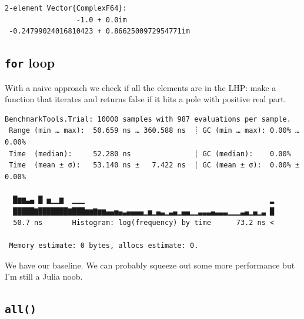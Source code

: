 \documentclass[
  8pt,
  a4paper,
]{book}
\newenvironment{Shaded}{\begin{snugshade}}{\end{snugshade}}
\newcommand{\ConstantTok}[1]{\textcolor[rgb]{0.56,0.35,0.01}{#1}}
\newcommand{\ControlFlowTok}[1]{\textcolor[rgb]{0.00,0.23,0.31}{\textbf{#1}}}
\newcommand{\FloatTok}[1]{\textcolor[rgb]{0.68,0.00,0.00}{#1}}
\newcommand{\FunctionTok}[1]{\textcolor[rgb]{0.28,0.35,0.67}{#1}}
\newcommand{\KeywordTok}[1]{\textcolor[rgb]{0.00,0.23,0.31}{\textbf{#1}}}
\newcommand{\NormalTok}[1]{\textcolor[rgb]{0.00,0.23,0.31}{#1}}
\newcommand{\OperatorTok}[1]{\textcolor[rgb]{0.37,0.37,0.37}{#1}}
\newcommand{\PreprocessorTok}[1]{\textcolor[rgb]{0.68,0.00,0.00}{#1}}
\begin{document}
\begin{verbatim}
2-element Vector{ComplexF64}:
                 -1.0 + 0.0im
 -0.24799024016810423 + 0.8662500972954771im
\end{verbatim}

\subsection{\texorpdfstring{\texttt{for}
loop}{for loop}}\label{for-loop}

With a naive approach we check if all the elements are in the LHP: make
a function that iterates and returns false if it hits a pole with
positive real part.

\begin{Shaded}
\end{Shaded}

\begin{verbatim}
BenchmarkTools.Trial: 10000 samples with 987 evaluations per sample.
 Range (min … max):  50.659 ns … 360.588 ns  ┊ GC (min … max): 0.00% … 0.00%
 Time  (median):     52.280 ns               ┊ GC (median):    0.00%
 Time  (mean ± σ):   53.140 ns ±   7.422 ns  ┊ GC (mean ± σ):  0.00% ± 0.00%

  █▆▆▃▄ █ ▅▁▁▆  ▁▁▁                                            ▂
  █████▇███████▇███▆▆▇▆▆▄▄▅▄▃▄▄▄▄▁▅▁▄▃▁▃▄▁▄▄▁▁▃▃▃▄▃▃▃▁▁▁▃▄▁▄▁▃ █
  50.7 ns       Histogram: log(frequency) by time      73.2 ns <

 Memory estimate: 0 bytes, allocs estimate: 0.
\end{verbatim}

We have our baseline. We can probably squeeze out some more performance
but I'm still a Julia noob.

\subsection{\texorpdfstring{\texttt{all()}}{all()}}\label{all}
\end{document}
